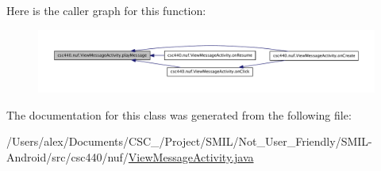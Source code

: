 Here is the caller graph for this function\-:
\nopagebreak
\begin{figure}[H]
\begin{center}
\leavevmode
\includegraphics[width=350pt]{classcsc440_1_1nuf_1_1_view_message_activity_af7da4ac74c5aeb46448c50fa8479e13a_icgraph}
\end{center}
\end{figure}




The documentation for this class was generated from the following file\-:\begin{DoxyCompactItemize}
\item 
/\-Users/alex/\-Documents/\-C\-S\-C\-\_/\-Project/\-S\-M\-I\-L/\-Not\-\_\-\-User\-\_\-\-Friendly/\-S\-M\-I\-L-\/\-Android/src/csc440/nuf/\hyperlink{_view_message_activity_8java}{View\-Message\-Activity.\-java}\end{DoxyCompactItemize}
